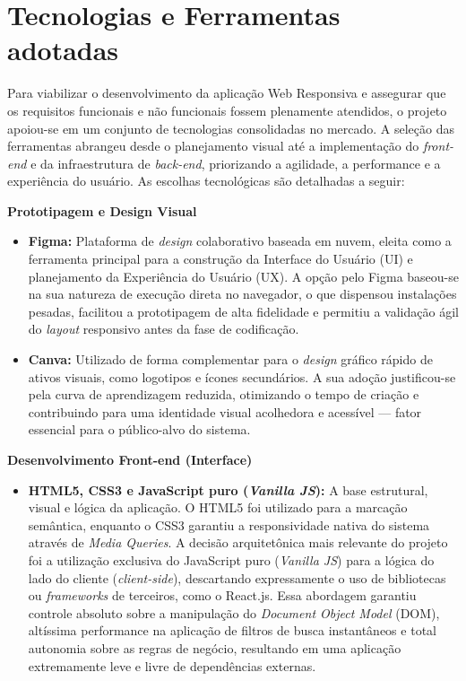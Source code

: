 \vspace{0.5cm}
\section{Tecnologias e Ferramentas adotadas}

Para viabilizar o desenvolvimento da aplicação Web Responsiva e assegurar que os requisitos funcionais e não funcionais fossem plenamente atendidos, o projeto apoiou-se em um conjunto de tecnologias consolidadas no mercado. A seleção das ferramentas abrangeu desde o planejamento visual até a implementação do \textit{front-end} e da infraestrutura de \textit{back-end}, priorizando a agilidade, a performance e a experiência do usuário. As escolhas tecnológicas são detalhadas a seguir:

\vspace{0.3cm}
\noindent\textbf{Prototipagem e Design Visual}

\begin{itemize}
    \item \textbf{Figma:} Plataforma de \textit{design} colaborativo baseada em nuvem, eleita como a ferramenta principal para a construção da Interface do Usuário (UI) e planejamento da Experiência do Usuário (UX). A opção pelo Figma baseou-se na sua natureza de execução direta no navegador, o que dispensou instalações pesadas, facilitou a prototipagem de alta fidelidade e permitiu a validação ágil do \textit{layout} responsivo antes da fase de codificação.
    
    \item \textbf{Canva:} Utilizado de forma complementar para o \textit{design} gráfico rápido de ativos visuais, como logotipos e ícones secundários. A sua adoção justificou-se pela curva de aprendizagem reduzida, otimizando o tempo de criação e contribuindo para uma identidade visual acolhedora e acessível — fator essencial para o público-alvo do sistema.
\end{itemize}

\vspace{0.3cm}
\noindent \textbf{Desenvolvimento Front-end (Interface)}

\begin{itemize}
    \item \textbf{HTML5, CSS3 e JavaScript puro (\textit{Vanilla JS}):} A base estrutural, visual e lógica da aplicação. O HTML5 foi utilizado para a marcação semântica, enquanto o CSS3 garantiu a responsividade nativa do sistema através de \textit{Media Queries}. A decisão arquitetônica mais relevante do projeto foi a utilização exclusiva do JavaScript puro (\textit{Vanilla JS}) para a lógica do lado do cliente (\textit{client-side}), descartando expressamente o uso de bibliotecas ou \textit{frameworks} de terceiros, como o React.js. Essa abordagem garantiu controle absoluto sobre a manipulação do \textit{Document Object Model} (DOM), altíssima performance na aplicação de filtros de busca instantâneos e total autonomia sobre as regras de negócio, resultando em uma aplicação extremamente leve e livre de dependências externas.
\end{itemize}

